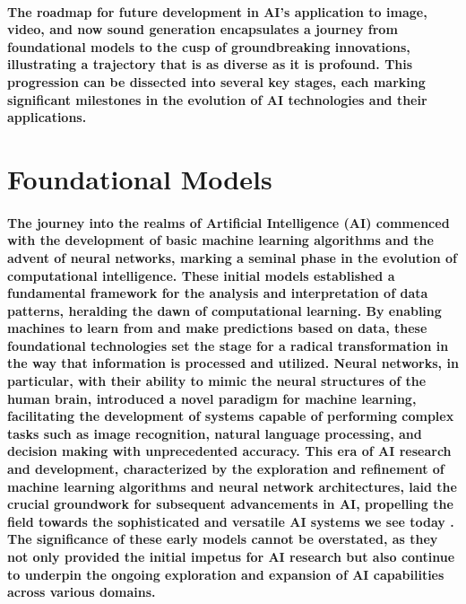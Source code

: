 \documentclass[11pt,a4paper,oneside]{report}
\begin{document}

\paragraph{The roadmap for future development in AI's application to image, video, and now sound generation encapsulates a journey from foundational models to the cusp of groundbreaking innovations, illustrating a trajectory that is as diverse as it is profound. This progression can be dissected into several key stages, each marking significant milestones in the evolution of AI technologies and their applications.}

\section{Foundational Models}
\paragraph{The journey into the realms of Artificial Intelligence (AI) commenced with the development of basic machine learning algorithms and the advent of neural networks, marking a seminal phase in the evolution of computational intelligence. These initial models established a fundamental framework for the analysis and interpretation of data patterns, heralding the dawn of computational learning. By enabling machines to learn from and make predictions based on data, these foundational technologies set the stage for a radical transformation in the way that information is processed and utilized. Neural networks, in particular, with their ability to mimic the neural structures of the human brain, introduced a novel paradigm for machine learning, facilitating the development of systems capable of performing complex tasks such as image recognition, natural language processing, and decision making with unprecedented accuracy. This era of AI research and development, characterized by the exploration and refinement of machine learning algorithms and neural network architectures, laid the crucial groundwork for subsequent advancements in AI, propelling the field towards the sophisticated and versatile AI systems we see today \cite{huang2022large}. The significance of these early models cannot be overstated, as they not only provided the initial impetus for AI research but also continue to underpin the ongoing exploration and expansion of AI capabilities across various domains.}
\end{document}
